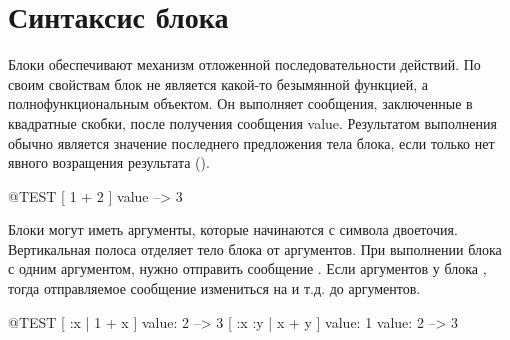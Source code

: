 \documentclass[a4paper,10pt,twoside]{book}
\begin{document}
\section{Синтаксис блока}


Блоки обеспечивают механизм отложенной последовательности действий.
По своим свойствам блок не является какой-то безымянной функцией, а полнофункциональным объектом.
Он выполняет сообщения, заключенные в квадратные скобки, после получения сообщения value.
Результатом выполнения обычно является значение последнего предложения тела блока, если только нет явного возращения результата (\ct{^}).

\begin{code}{@TEST}
[ 1 + 2 ] value --> 3
\end{code}


Блоки могут иметь аргументы, которые начинаются с символа \ct{(:)}двоеточия.
Вертикальная полоса отделяет тело блока от аргументов.
При выполнении блока с одним аргументом, нужно отправить сообщение .
Если аргументов у блока , тогда отправляемое сообщение измениться на  и т.д. до  аргументов.

\begin{code}{@TEST}
[ :x | 1 + x ] value: 2 --> 3
[ :x :y | x + y ] value: 1 value: 2 --> 3
\end{code}
\end{document}
